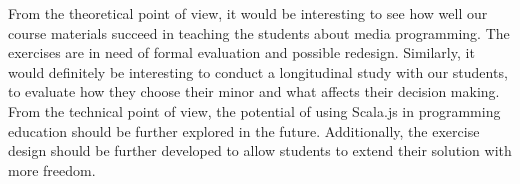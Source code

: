 From the theoretical point of view, it would be interesting to see how well our course materials succeed in teaching the students about media programming. The exercises are in need of formal evaluation and possible redesign. Similarly, it would definitely be interesting to conduct a longitudinal study with our students, to evaluate how they choose their minor and what affects their decision making. From the technical point of view, the potential of using Scala.js in programming education should be further explored in the future. Additionally, the exercise design should be further developed to allow students to extend their solution with more freedom.
